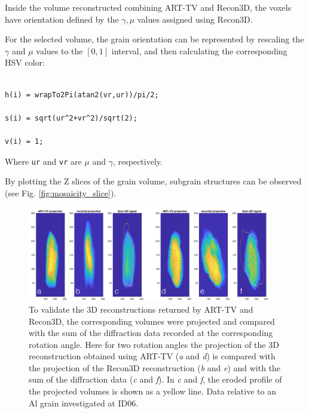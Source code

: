 \documentclass[11pt]{scrartcl}
\begin{document}
Inside the volume reconstructed combining {\footnotesize{ART-TV}} and Recon3D, the voxels have orientation defined by the $\gamma, \mu$ values assigned using Recon3D.

For the selected volume, the grain orientation can be represented by rescaling the $\gamma$ and $\mu$ values to the $[0,1]$ interval, and then calculating the corresponding HSV color:

\begin{verbatim}

h(i) = wrapTo2Pi(atan2(vr,ur))/pi/2;

s(i) = sqrt(ur^2+vr^2)/sqrt(2);

v(i) = 1;

\end{verbatim}

Where {\texttt{ur}} and {\texttt{vr}} are $\mu$ and $\gamma$, respectively.

By plotting the {\footnotesize{Z}} slices of the grain volume, subgrain structures can be observed (see Fig. \ref{fig:mosaicity_slice}).

\begin{figure}
    \centering
    \includegraphics[width=0.95\textwidth]{compare_proj_diff_all_proj.png}
    \caption{To validate the 3D reconstructions returned by {\footnotesize{ART-TV}} and Recon3D, the corresponding volumes were projected and compared with the sum of the diffraction data recorded at the corresponding rotation angle. Here for two rotation angles the projection of the {\footnotesize{3D}} reconstruction obtained using {\footnotesize{ART-TV}} ({\emph{a}} and {\emph{d}}) is compared with the projection of the Recon3D reconstruction ({\emph{b}} and {\emph{e}}) and with the sum of the diffraction data ({\emph{c}} and {\emph{f}}). In {\emph{c}} and {\emph{f}}, the eroded profile of the projected volumes is shown as a yellow line. Data relative to an Al grain investigated at {\footnotesize{ID06}}.}
    \label{fig:compare_proj}
\end{figure}
\end{document}
